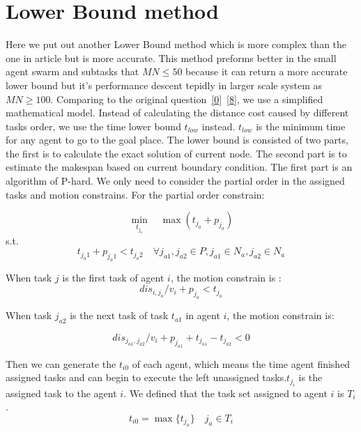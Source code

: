 \section{Lower Bound method}
\label{lower bound method}
Here we put out another Lower Bound method which is more complex than the one in article but is more accurate. This
method preforms better in the small agent swarm and subtasks that $MN\leq 50$ because it can return a more accurate
lower bound but it's performance descent tepidly in larger scale system as $MN\geq 100$. 
Comparing to the original question~\ref{0}~\ref{8}, we use a simplified mathematical model.  
Instead of calculating the distance cost caused by different tasks order, we use the time lower
bound $t_{low}$ instead. $t_{low}$ is the minimum time for any agent to go to the goal place.
   The lower bound is consisted of two parts, the first is to calculate the exact solution of current node. The
second part is to estimate the makespan based on current boundary condition. The first part is an algorithm of P-hard.
We only need to consider the partial order in the assigned tasks and motion constrains. For the partial order constrain:

$$\min_{t_{j_a}} \quad \max(t_{j_a}+p_{j_a})$$
s.t.\\

\begin{equation}
 t_{j_a1} + p_{j_a1}< t_{j_a2}   \quad \forall j_{a1}, j_{a2} \in P , j_{a1} \in N_a, j_{a2} \in N_a
\label{9}
\end{equation}

When task $j$ is the first task of agent $i$, the motion constrain is :
\begin{equation}
dis_{i,j_a}/v_i+ p_{j_a}< t_{j_a}
\label{10}
\end{equation}

When task $j_{a2}$ is the next task of task $t_{a1}$ in agent $i$, the motion constrain is:

\begin{equation}
dis_{j_{a1},j_{a2}}/v_i+ p_{j_{a1}}+t_{j_{a1}}- t_{j_{a2}}<0
\label{11}
\end{equation}

Then we can generate the $t_{i0}$ of each agent, which means the time agent finished assigned tasks
 and can begin to execute the left unassigned tasks.$t_{j_i}$ is the assigned task to the agent $i$.
We defined that the task set assigned to agent $i$ is $T_i$.
\begin{equation}
t_{i0} = \max{\{t_{j_a}\}}    \quad {j_a}\in T_i
\label{12}
\end{equation}

